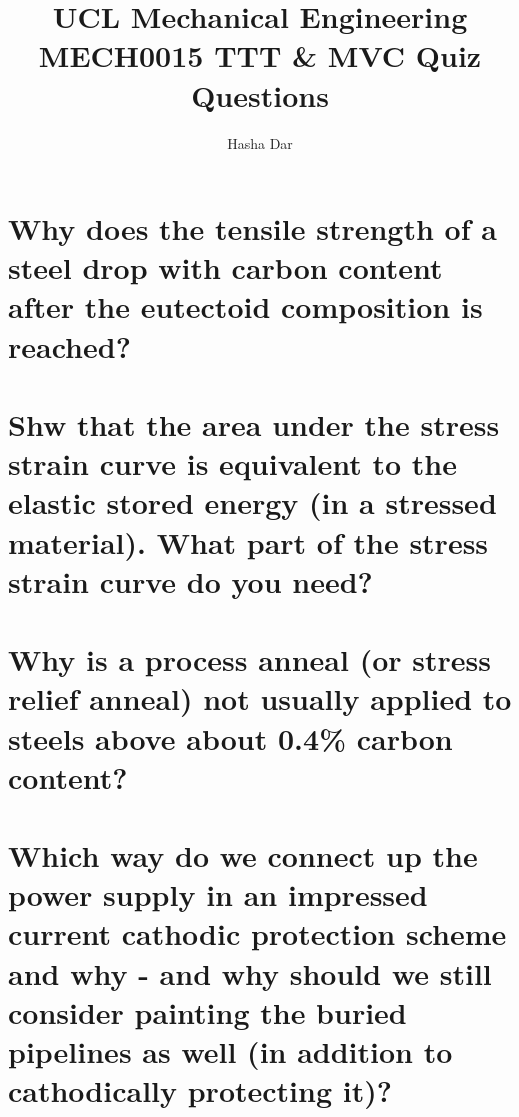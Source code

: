 \documentclass[11pt]{article}
\begin{document}
\title{\textbf{UCL Mechanical Engineering}\\MECH0015 TTT \& MVC Quiz Questions}
\author{Hasha Dar}
\maketitle
\section{Why does the tensile strength of a steel drop with carbon content after the eutectoid composition is reached?}
\section{Shw that the area under the stress strain curve is equivalent to the elastic stored energy (in a stressed material). What part of the stress strain curve do you need?}
\section{Why is a process anneal (or stress relief anneal) not usually applied to steels above about 0.4\% carbon content? }
\section{Which way do we connect up the power supply in an impressed current cathodic protection scheme and why - and why should we still consider painting the buried pipelines as well (in addition to cathodically protecting it)?}
\end{document}
